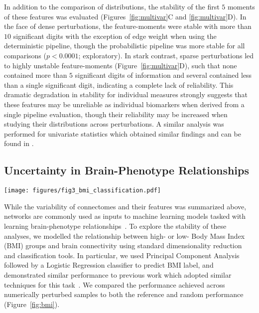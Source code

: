\documentclass[fleqn,10pt]{SelfArx} %
\newcommand{\new}[1]{{#1}}
\newcommand{\newtwo}[1]{{#1}}
\begin{document}
In addition to the comparison of distributions, the stability of the first $5$ moments of these features was evaluated
(Figures~\ref{fig:multivar}C and \ref{fig:multivar}D). In the face of \new{dense} perturbations, the feature-moments
were stable with more than $10$ significant digits with the exception of edge weight when using the deterministic
pipeline, though the probabilistic pipeline was more stable for all comparisons ($p < 0.0001$; exploratory). In stark
contrast, \new{sparse} perturbations led to highly unstable feature-moments (Figure~\ref{fig:multivar}D), such that
none contained more than $5$ significant digits of information and several contained less than a single significant
digit, indicating a complete lack of reliability. This dramatic degradation in stability for individual measures
strongly suggests that these features may be unreliable as individual biomarkers when derived from a single pipeline
evaluation, though their reliability may be increased when studying their distributions across perturbations. A similar
analysis was performed for univariate statistics \new{which obtained similar findings} and can be found in
.

\subsection*{Uncertainty in Brain-Phenotype Relationships}

\begin{figure*}[ht]\centering
\texttt{[image: figures/fig3\_bmi\_classification.pdf]}
\caption{Variability in BMI classification across the sampling of an MCA-perturbed dataset. The dashed red lines
indicate random-chance performance, and the orange dots show the performance using the reference executions.}
\label{fig:bmi}
\end{figure*}
 
While the variability of connectomes and their features was summarized above, networks are commonly used as inputs to
machine learning models tasked with learning brain-phenotype relationships~\cite{Dubois2016-yr}. To explore the
stability of these analyses, we modelled the relationship between high- or low- Body Mass Index (BMI) groups and brain
connectivity using standard dimensionality reduction and classification tools. \newtwo{In particular, we used Principal
Component Analysis followed by a Logistic Regression classifier to predict BMI label, and demonstrated similar performance
to previous work which adopted similar techniques for this task~\cite{Park2015-uj,Gupta2015-ap}. We}
compared \newtwo{the performance achieved across numerically perturbed samples to both the} reference and random
performance (Figure~\ref{fig:bmi}).
\end{document}
